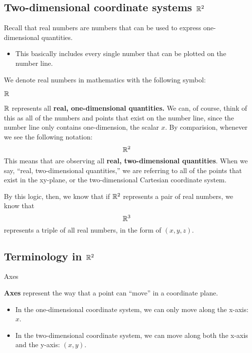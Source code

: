 \documentclass{report}
\begin{document}
\begin{sloppypar}
\subsection{Two-dimensional coordinate systems $ \mathbb{R}^{2} $}
Recall that real numbers are numbers that
can be used to express one-dimensional
quantities.
\begin{itemize}
  \item This basically includes
        every single number that can be
        plotted on the number line.
\end{itemize}
We denote real numbers in mathematics with
the following symbol:
\begin{center}
  $ \mathbb{R} $
\end{center}
$ \mathbb{R} $ represents all \textbf{real,  one-dimensional
  quantities.} We can, of course,
think of this as all of the numbers and points
that exist on the number line, since
the number line only contains one-dimension,
the scalar $x$.
By comparision, whenever we see
the following notation:
\[ \mathbb{R}^{2}\]
This means that are observing all \textbf{real, two-dimensional quantities}.
When we say, ``real, two-dimensional
quantities,'' we are referring to all of
the points that exist in the xy-plane, or
the two-dimensional Cartesian coordinate
system.
\par By this logic, then, we know that if
$ \mathbb{R}^{2} $ represents a pair of real numbers,
we know that
\[ \mathbb{R}^{3} \]
represents a triple of all real numbers, in
the form of $ (x, y, z)$.

\subsection{Terminology in $\mathbb{R}^{2}$}
\theoremstyle{definition}
\begin{definition}
  Axes
\end{definition}
\textbf{Axes} represent the way that a point can
``move'' in a coordinate plane.
\begin{itemize}
  \item In the one-dimensional coordinate
        system, we can only move along the
        x-axis: $ x $.
  \item In the two-dimensional
        coordinate system, we can move
        along both the x-axis and the y-axis:
        $ (x, y) $.
\end{itemize}


\end{sloppypar}
\end{document}
